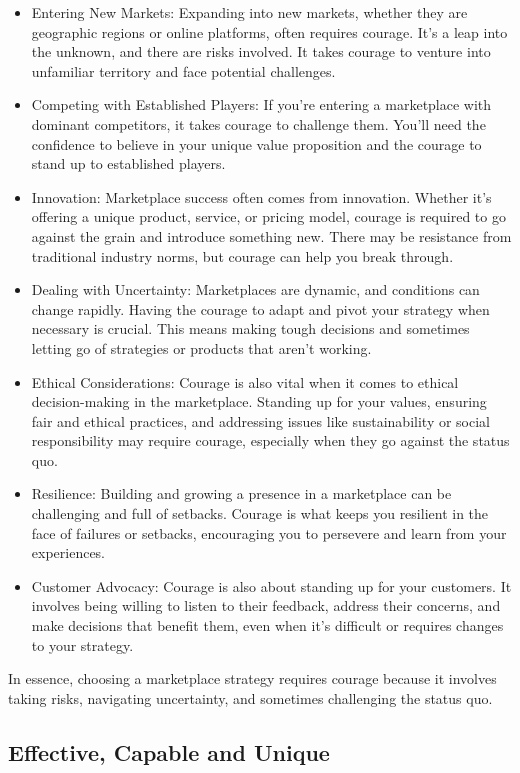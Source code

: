 \documentclass[
]{book}
\begin{document}
\begin{itemize}
\item
  Entering New Markets: Expanding into new markets, whether they are geographic regions or online platforms, often requires courage. It's a leap into the unknown, and there are risks involved. It takes courage to venture into unfamiliar territory and face potential challenges.
\item
  Competing with Established Players: If you're entering a marketplace with dominant competitors, it takes courage to challenge them. You'll need the confidence to believe in your unique value proposition and the courage to stand up to established players.
\item
  Innovation: Marketplace success often comes from innovation. Whether it's offering a unique product, service, or pricing model, courage is required to go against the grain and introduce something new. There may be resistance from traditional industry norms, but courage can help you break through.
\item
  Dealing with Uncertainty: Marketplaces are dynamic, and conditions can change rapidly. Having the courage to adapt and pivot your strategy when necessary is crucial. This means making tough decisions and sometimes letting go of strategies or products that aren't working.
\item
  Ethical Considerations: Courage is also vital when it comes to ethical decision-making in the marketplace. Standing up for your values, ensuring fair and ethical practices, and addressing issues like sustainability or social responsibility may require courage, especially when they go against the status quo.
\item
  Resilience: Building and growing a presence in a marketplace can be challenging and full of setbacks. Courage is what keeps you resilient in the face of failures or setbacks, encouraging you to persevere and learn from your experiences.
\item
  Customer Advocacy: Courage is also about standing up for your customers. It involves being willing to listen to their feedback, address their concerns, and make decisions that benefit them, even when it's difficult or requires changes to your strategy.
\end{itemize}

In essence, choosing a marketplace strategy requires courage because it involves taking risks, navigating uncertainty, and sometimes challenging the status quo.

\hypertarget{effective-capable-and-unique}{%
\subsection{Effective, Capable and Unique}\label{effective-capable-and-unique}}
\end{document}
